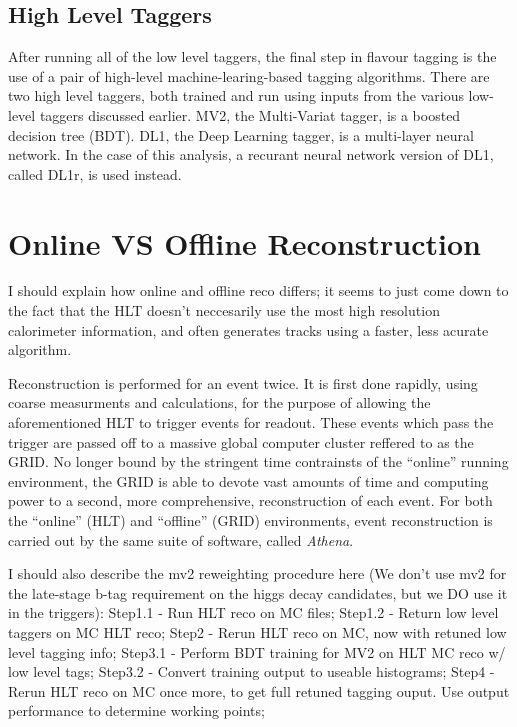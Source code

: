         \subsection{High Level Taggers}

            After running all of the low level taggers,
                the final step in flavour tagging is the use of a pair of high-level machine-learing-based tagging algorithms.
            There are two high level taggers, both trained and run using inputs from the various low-level taggers discussed earlier.
            MV2, the Multi-Variat tagger, is a boosted decision tree (BDT).
            DL1, the Deep Learning tagger, is a multi-layer neural network.
            In the case of this analysis, a recurant neural network version of DL1, called DL1r, is used instead.
            \cite{bjet_id_and_performance}
            \cite{btagging_optimisation}

    \section{Online VS Offline Reconstruction}

        I should explain how online and offline reco differs;
            it seems to just come down to the fact that the HLT doesn't neccesarily use the most high resolution calorimeter information,
            and often generates tracks using a faster, less acurate algorithm.

        Reconstruction is performed for an event twice.
        It is first done rapidly, using coarse measurments and calculations,
            for the purpose of allowing the aforementioned HLT to trigger events for readout.
        These events which pass the trigger are passed off to a massive global computer cluster reffered to as the GRID.
        No longer bound by the stringent time contrainsts of the ``online'' running environment,
            the GRID is able to devote vast amounts of time and computing power to a second, 
            more comprehensive, reconstruction of each event.
        For both the ``online'' (HLT) and ``offline'' (GRID) environments, event reconstruction is carried out by the same suite of software,
            called \textit{Athena}.

            
        I should also describe the mv2 reweighting procedure here
            (We don't use mv2 for the late-stage b-tag requirement on the higgs decay candidates,
            but we DO use it in the triggers):
            Step1.1 - Run HLT reco on MC files;
            Step1.2 - Return low level taggers on MC HLT reco;
            Step2   - Rerun HLT reco on MC, now with retuned low level tagging info;
            Step3.1 - Perform BDT training for MV2 on HLT MC reco w/ low level tags;
            Step3.2 - Convert training output to useable histograms;
            Step4   - Rerun HLT reco on MC once more, to get full retuned tagging ouput. Use output performance to determine working points;

